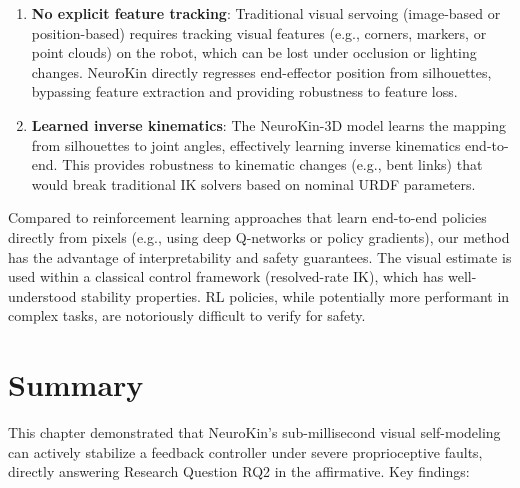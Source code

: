 ﻿\documentclass[12pt,a4paper,oneside]{report}
\begin{document}
\begin{enumerate}
    \item \textbf{No explicit feature tracking}: Traditional visual servoing (image-based or position-based) requires tracking visual features (e.g., corners, markers, or point clouds) on the robot, which can be lost under occlusion or lighting changes. NeuroKin directly regresses end-effector position from silhouettes, bypassing feature extraction and providing robustness to feature loss.
    \item \textbf{Learned inverse kinematics}: The NeuroKin-3D model learns the mapping from silhouettes to joint angles, effectively learning inverse kinematics end-to-end. This provides robustness to kinematic changes (e.g., bent links) that would break traditional IK solvers based on nominal URDF parameters.
\end{enumerate}

Compared to reinforcement learning approaches that learn end-to-end policies directly from pixels (e.g., using deep Q-networks or policy gradients), our method has the advantage of interpretability and safety guarantees. The visual estimate is used within a classical control framework (resolved-rate IK), which has well-understood stability properties. RL policies, while potentially more performant in complex tasks, are notoriously difficult to verify for safety.

\section{Summary}

This chapter demonstrated that NeuroKin's sub-millisecond visual self-modeling can actively stabilize a feedback controller under severe proprioceptive faults, directly answering Research Question RQ2 in the affirmative. Key findings:
\end{document}
